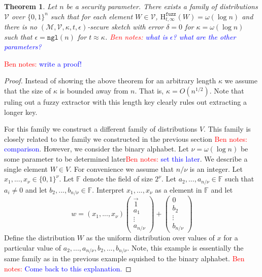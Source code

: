 \documentclass[11pt]{article}
\newcommand{\zo}{\ensuremath{\{0, 1\}}}
\newcommand{\ngl}{\ensuremath{\mathtt{ngl}}\xspace}
\newcommand{\Hfuzz}{\mathrm{H}^{\mathtt{fuzz}}_{t,\infty}}
\newtheorem{theorem}{Theorem}[section]
\newcommand{\authnote}[2]{{\textcolor{red}{\textsf{#1 notes: }\textcolor{blue}{ #2}}\marginpar{\textcolor{red}{\textbf{!!!!!}}}}}
\newcommand{\authnote}[2]{}
\newcommand{\bnote}[1]{{\authnote{Ben}{#1}}}
\begin{document}
\begin{theorem}
\label{thm:imposs fuzz ext}
Let $n$ be a security parameter.  There exists a family of distributions $\mathcal{V}$ over $\zo^n$ such that for each element $W\in \mathcal{V}$, $\Hfuzz(W)= \omega(\log n)$ and there is no $(\mathcal{M}, \mathcal{V}, \kappa, t, \epsilon)$-secure sketch with error $\delta = 0$ for $\kappa =\omega(\log n)$ such that $\epsilon =\ngl( n)$ for $t \approx \kappa $. \bnote{what is $\epsilon$? what are the other parameters?}
\end{theorem}
 \bnote{write a proof!}
\begin{proof}
Instead of showing the above theorem for an arbitrary length $\kappa$ we assume that the size of $\kappa$ is bounded away from $n$.  That is, $\kappa = O(n^{1/2})$.  Note that ruling out a fuzzy extractor with this length key clearly rules out extracting a longer key.

For this family we construct a different family of distributions $V$.  This family is closely related to the family we constructed in the previous section \bnote{comparison}.  However, we consider the binary alphabet.  Let $\nu = \omega(\log n)$ be some parameter to be determined later\bnote{set this later}.  We describe a single element $W\in V$. For convenience we assume that $n/\nu$ is an integer.  Let $x_1,..., x_\nu \in \zo^\nu$.  Let $\mathbb{F}$ denote the field of size $2^{\nu}$.  Let $a_2,..., a_{n/\nu}\in\mathbb{F}$ such that $a_i\neq 0$ and let $b_2,..., b_{n/\nu}\in\mathbb{F}$.  
Interpret $x_1,..., x_{\nu}$ as a element in $\mathbb{F}$ and let 
\[w = (x_1,..., x_{\nu})  \begin{pmatrix} \vec{1} \\a_1  \\ \vdots \\ a_{n/\nu} \end{pmatrix} + \begin{pmatrix} 0  \\ 
b_2\\ \vdots \\ b_{n/\nu} \end{pmatrix} 
\]
Define the distribution $W$ as the uniform distribution over values of $x$ for a particular value of $a_2,..., a_{n/\nu}, b_2,..., b_{n/\nu}$.  Note, this example is essentially the same family as in the previous example squished to the binary alphabet.  \bnote{Come back to this explanation.}


\end{proof}
\end{document}
